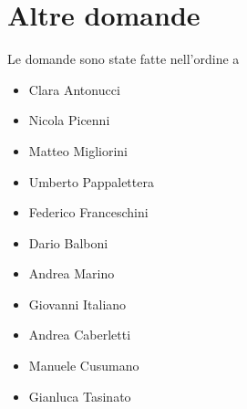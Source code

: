 \section*{Altre domande}
Le domande sono state fatte nell'ordine a 
\begin{itemize}
\item Clara Antonucci
\item Nicola Picenni
\item Matteo Migliorini
\item Umberto Pappalettera
\item Federico Franceschini
\item Dario Balboni
\item Andrea Marino
\item Giovanni Italiano
\item Andrea Caberletti
\item Manuele Cusumano
\item Gianluca Tasinato
\end{itemize}

\bigskip
\bigskip

